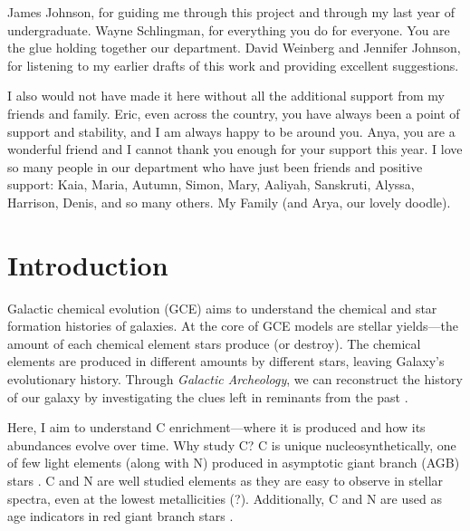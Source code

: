 \documentclass[12pt,oneside]{report}
\begin{document}
James Johnson, for guiding me through this project and through my last year of undergraduate.
Wayne Schlingman, for everything you do for everyone. You are the glue holding together our department.
David Weinberg and Jennifer Johnson, for listening to my earlier drafts of this work and providing excellent suggestions.

I also would not have made it here without all the additional support from my friends and family. Eric, even across the country, you have always been a point of support and stability, and I am always happy to be around you. Anya, you are a wonderful friend and I cannot thank you enough for your support this year. 
I love so many people in our department who have just been friends and positive support: Kaia, Maria, Autumn, Simon, Mary, Aaliyah, Sanskruti, Alyssa, Harrison, Denis, and so many others. 
My Family (and Arya, our lovely doodle).


\tableofcontents
\listoffigures
\listoftables
\newpage
{}



\chapter{Introduction}

Galactic chemical evolution (GCE) aims to understand the chemical and star formation histories of galaxies. At the core of GCE models are stellar yields---the amount of each chemical element stars produce (or destroy). The chemical elements are produced in different amounts by different stars, leaving Galaxy's evolutionary history. Through \textit{Galactic Archeology}, we can reconstruct the history of our galaxy by investigating the clues left in reminants from the past \citep{Weinberg+22, emily+19}.

Here, I aim to understand C enrichment---where it is produced and how its abundances evolve over time. Why study C? C is unique nucleosynthetically, one of few light elements (along with N) produced in asymptotic giant branch (AGB) stars \citep[e.g.][]{jennifer19, KL14}. C and N are well studied elements as they are easy to observe in stellar spectra, even at the lowest metallicities \citep{FN15}(?). Additionally, C and N are used as age indicators in red giant branch stars \citep[e.g.][]{martig16, MG15, fiorenzo+21}.
\end{document}
